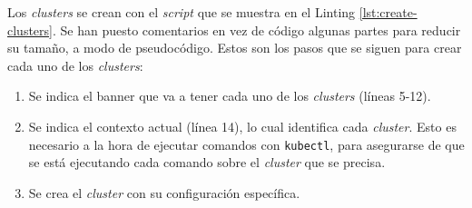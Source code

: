 Los \textit{clusters} se crean con el \textit{script} que se muestra en el Linting \ref{lst:create-clusters}. Se han puesto comentarios en vez de código algunas partes para reducir su tamaño, a modo de pseudocódigo. Estos son los pasos que se siguen para crear cada uno de los \textit{clusters}:

\begin{enumerate}
  \item Se indica el banner que va a tener cada uno de los \textit{clusters} (líneas 5-12).
  \item Se indica el contexto actual (línea 14), lo cual identifica cada \textit{cluster}. Esto es necesario a la hora de ejecutar comandos con \texttt{kubectl}, para asegurarse de que se está ejecutando cada comando sobre el \textit{cluster} que se precisa.
  \item Se crea el \textit{cluster} con su configuración específica.
\end{enumerate}

